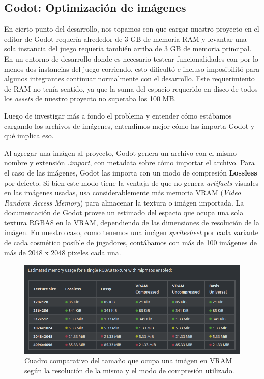 \subsection{Godot: Optimización de imágenes}

En cierto punto del desarrollo, nos topamos con que cargar nuestro proyecto en el editor de Godot
requería alrededor de 3 GB de memoria RAM y levantar una sola instancia del juego requería también
arriba de 3 GB de memoria principal. En un entorno de desarrollo donde es necesario testear
funcionalidades con por lo menos dos instancias del juego corriendo, esto dificultó e incluso
imposibilitó para algunos integrantes continuar normalmente con el desarrollo. Este requerimiento
de RAM no tenía sentido, ya que la suma del espacio requerido en disco de todos los 
\textit{assets} de nuestro proyecto no superaba los 100 MB.

Luego de investigar más a fondo el problema y entender cómo estábamos cargando los archivos de imágenes,
entendimos mejor cómo las importa Godot y qué implica eso.

Al agregar una imágen al proyecto, Godot genera un archivo con el mismo nombre y extensión 
\textit{.import}, con metadata sobre cómo importar el archivo. Para el caso de las imágenes, 
Godot las importa con un modo de compresión \textbf{Lossless} por defecto. Si bien este modo
tiene la ventaja de que no genera \textit{artifacts} visuales en las imágenes usadas, usa 
considerablemente más memoria VRAM (\textit{Video Random Access Memory}) para almacenar la textura o
imágen importada. La documentación de Godot\cite{ref2} provee un estimado del espacio que ocupa una sola textura
RGBA8 en la VRAM, dependiendo de las dimensiones de resolución de la imágen. En nuestro caso, como
tenemos una imágen \textit{spritesheet} por cada variante de cada cosmético posible de jugadores,
contábamos con más de 100 imágenes de más de 2048 x 2048 pixeles cada una. 

\begin{figure}[htbp]
    \centering
    \includegraphics[width=1.0\textwidth]{../assets/godot-docs-images.png}
    \caption{Cuadro comparativo del tamaño que ocupa una imágen en VRAM según la resolución
             de la misma y el modo de compresión utilizado.}
\end{figure}

